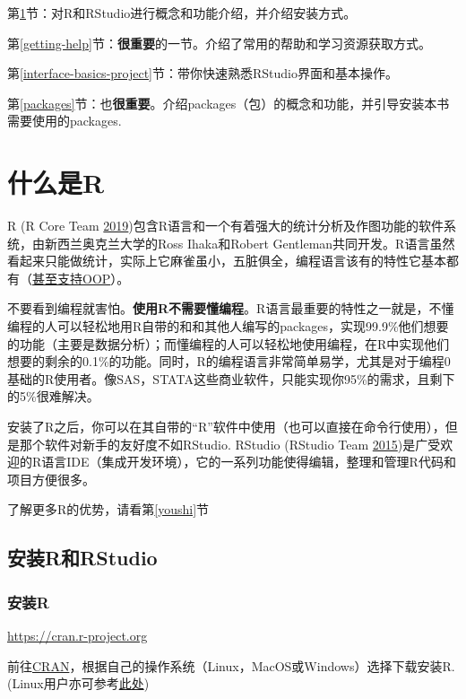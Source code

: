 \documentclass[]{book}
\begin{document}
第\ref{what-is-R}节：对R和RStudio进行概念和功能介绍，并介绍安装方式。

第\ref{getting-help}节：\textbf{很重要}的一节。介绍了常用的帮助和学习资源获取方式。

第\ref{interface-basics-project}节：带你快速熟悉RStudio界面和基本操作。

第\ref{packages}节：也\textbf{很重要}。介绍packages（包）的概念和功能，并引导安装本书需要使用的packages.

\hypertarget{what-is-R}{%
\section{什么是R}\label{what-is-R}}

R (R Core Team \protect\hyperlink{ref-R-base}{2019})包含R语言和一个有着强大的统计分析及作图功能的软件系统，由新西兰奥克兰大学的Ross Ihaka和Robert Gentleman共同开发。R语言虽然看起来只能做统计，实际上它麻雀虽小，五脏俱全，编程语言该有的特性它基本都有（\href{https://adv-r.hadley.nz/oo.html}{甚至支持OOP}）。

不要看到编程就害怕。\textbf{使用R不需要懂编程}。R语言最重要的特性之一就是，不懂编程的人可以轻松地用R自带的和和其他人编写的packages，实现99.9\%他们想要的功能（主要是数据分析）；而懂编程的人可以轻松地使用编程，在R中实现他们想要的剩余的0.1\%的功能。同时，R的编程语言非常简单易学，尤其是对于编程0基础的R使用者。像SAS，STATA这些商业软件，只能实现你95\%的需求，且剩下的5\%很难解决。

安装了R之后，你可以在其自带的``R''软件中使用（也可以直接在命令行使用），但是那个软件对新手的友好度不如RStudio. RStudio (RStudio Team \protect\hyperlink{ref-R-rstudio}{2015})是广受欢迎的R语言IDE（集成开发环境），它的一系列功能使得编辑，整理和管理R代码和项目方便很多。

了解更多R的优势，请看第\ref{youshi}节

\hypertarget{R-and-RStudio-install}{%
\subsection{安装R和RStudio}\label{R-and-RStudio-install}}

\hypertarget{R-install}{%
\subsubsection{安装R}\label{R-install}}

\url{https://cran.r-project.org}

前往\href{https://cran.r-project.org}{CRAN}，根据自己的操作系统（Linux，MacOS或Windows）选择下载安装R. (Linux用户亦可参考\href{https://blog.zenggyu.com/en/post/2018-01-29/installing-r-r-packages-e-g-tidyverse-and-rstudio-on-ubuntu-linux/}{此处})
\end{document}
